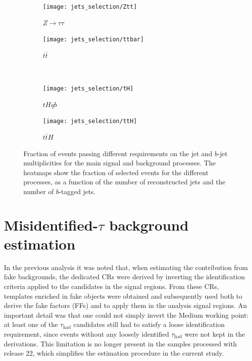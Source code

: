 \begin{figure}[htbp]
    \centering
    \begin{subfigure}[b]{0.45\textwidth}
      \centering
      \texttt{[image: jets\_selection/Ztt]}
      \caption{$Z\to\tau\tau$}
      \label{fig:jetsel_ztt}
    \end{subfigure}
    \hfill
    \begin{subfigure}[b]{0.45\textwidth}
      \centering
      \texttt{[image: jets\_selection/ttbar]}
      \caption{$t\bar{t}$}
      \label{fig:jetsel_ttbar}
    \end{subfigure}
    \\[0.3cm]
    \begin{subfigure}[b]{0.45\textwidth}
      \centering
      \texttt{[image: jets\_selection/tH]}
      \caption{$tHqb$}
      \label{fig:jetsel_th}
    \end{subfigure}
    \hfill
    \begin{subfigure}[b]{0.45\textwidth}
      \centering
      \texttt{[image: jets\_selection/ttH]}
      \caption{$t\bar{t}H$}
      \label{fig:jetsel_tth}
    \end{subfigure}
    \caption{
      Fraction of events passing different requirements on the jet and $b$-jet multiplicities
      for the main signal and background processes. 
      The heatmaps show the fraction of selected events for the different processes, 
      as a function of the number of reconstructed jets and the number of $b$-tagged jets.
    }
    \label{jets_selection}
  \end{figure}
  
\section{Misidentified-$\tau$ background estimation}
\label{fakes_run3}

In the previous analysis it was noted that, when estimating the contribution from fake \tauhad backgrounds, the dedicated CRs were derived by inverting the identification criteria applied to the \tauhad candidates in the signal regions. From these CRs, templates enriched in fake \tauhad objects were obtained and subsequently used both to derive the fake factors (FFs) and to apply them in the analysis signal regions. An important detail was that one could not simply invert the Medium working point: at least one of the $\tau_{\mathrm{had}}$ candidates still had to satisfy a loose identification requirement, since events without any loosely identified $\tau_{\mathrm{had}}$ were not kept in the derivations. This limitation is no longer present in the samples processed with release 22, which simplifies the estimation procedure in the current study.


